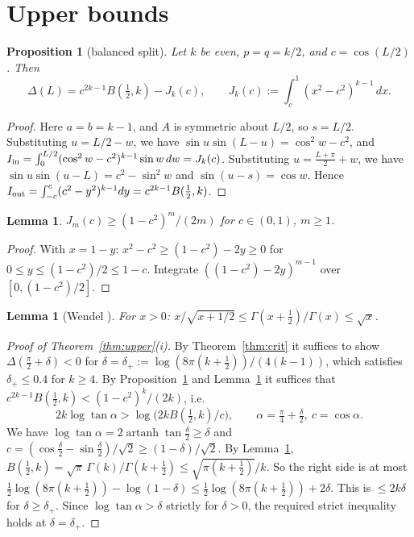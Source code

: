 \documentclass[11pt]{amsart}
\newtheorem{proposition}[theorem]{Proposition}
\newtheorem{lemma}[theorem]{Lemma}
\theoremstyle{definition}
\begin{document}
\section{Upper bounds}

\begin{proposition}[balanced split]\label{prop:bal}
Let $k$ be even, $p=q=k/2$, and $c=\cos(L/2)$. Then
\[
\Delta(L)=c^{2k-1}B(\tfrac12,k)-J_k(c),\qquad J_k(c):=\int_c^1(x^2-c^2)^{k-1}\,dx .
\]
\end{proposition}
\begin{proof}
Here $a=b=k-1$, and $A$ is symmetric about $L/2$, so $s=L/2$. Substituting $u=L/2-w$, we have $\sin u\sin(L-u)=\cos^2w-c^2$, and
$I_{\rm in}=\int_0^{L/2}(\cos^2w-c^2)^{k-1}\sin w\,dw=J_k(c)$. Substituting $u=\frac{L+\pi}2+w$, we have
$\sin u\sin(u-L)=c^2-\sin^2w$ and $\sin(u-s)=\cos w$. Hence $I_{\rm out}=\int_{-c}^c(c^2-y^2)^{k-1}dy=c^{2k-1}B(\frac12,k)$.
\end{proof}

\begin{lemma}\label{lem:J}
$J_m(c)\ge(1-c^2)^m/(2m)$ for $c\in(0,1)$, $m\ge1$.
\end{lemma}
\begin{proof}
With $x=1-y$: $x^2-c^2\ge(1-c^2)-2y\ge0$ for $0\le y\le(1-c^2)/2\le1-c$. Integrate $((1-c^2)-2y)^{m-1}$ over $[0,(1-c^2)/2]$.
\end{proof}

\begin{lemma}[Wendel \cite{Wen}]\label{lem:wendel}
For $x>0$: $x/\sqrt{x+1/2}\le\Gamma(x+\frac12)/\Gamma(x)\le\sqrt x$.
\end{lemma}

\begin{proof}[Proof of Theorem~\ref{thm:upper}(i)]
By Theorem~\ref{thm:crit} it suffices to show $\Delta(\frac\pi2+\delta)<0$ for $\delta=\delta_+:=\log(8\pi(k+\frac12))/(4(k-1))$,
which satisfies $\delta_+\le0.4$ for $k\ge4$. By Proposition~\ref{prop:bal} and Lemma~\ref{lem:J} it suffices that
$c^{2k-1}B(\frac12,k)<(1-c^2)^k/(2k)$, i.e.
\[
2k\log\tan\alpha>\log\big(2kB(\tfrac12,k)/c\big),\qquad\alpha=\tfrac\pi4+\tfrac\delta2,\ c=\cos\alpha .
\]
We have $\log\tan\alpha=2\operatorname{artanh}\tan\frac\delta2\ge\delta$ and $c=(\cos\frac\delta2-\sin\frac\delta2)/\sqrt2\ge(1-\delta)/\sqrt2$.
By Lemma~\ref{lem:wendel}, $B(\frac12,k)=\sqrt\pi\,\Gamma(k)/\Gamma(k+\frac12)\le\sqrt{\pi(k+\frac12)}/k$. So the right side is at most
$\frac12\log(8\pi(k+\frac12))-\log(1-\delta)\le\frac12\log(8\pi(k+\frac12))+2\delta$. This is $\le2k\delta$ for $\delta\ge\delta_+$.
Since $\log\tan\alpha>\delta$ strictly for $\delta>0$, the required strict inequality holds at $\delta=\delta_+$.
\end{proof}
\end{document}
